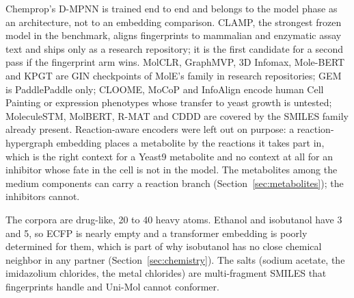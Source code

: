 \begin{table}[htbp]
\centering
\footnotesize
\caption{Provenance of the twelve encoders: representation family, training corpus,
objective and source. \tcflagext~Temporary: the linked works are not yet in the library
mirror and are given by their public link; the flag lifts when they are mirrored and cited
through the bibliography.}
\label{tab:provenance}

\end{table}

Chemprop's D-MPNN is trained end to end and belongs to the model phase as an architecture,
not to an embedding comparison. CLAMP, the strongest frozen model in the benchmark, aligns
fingerprints to mammalian and enzymatic assay text and ships only as a research repository;
it is the first candidate for a second pass if the fingerprint arm wins. MolCLR, GraphMVP, 3D
Infomax, Mole-BERT and KPGT are GIN checkpoints of MolE's family in research repositories; GEM
is PaddlePaddle only; CLOOME, MoCoP and InfoAlign encode human Cell Painting or expression
phenotypes whose transfer to yeast growth is untested; MoleculeSTM, MolBERT, R-MAT and CDDD
are covered by the SMILES family already present. Reaction-aware encoders were left out on
purpose: a reaction-hypergraph embedding places a metabolite by the reactions it takes part
in, which is the right context for a Yeast9 metabolite and no context at all for an inhibitor
whose fate in the cell is not in the model. The metabolites among the medium components can
carry a reaction branch (Section~\ref{sec:metabolites}); the inhibitors cannot.

The corpora are drug-like, 20 to 40 heavy atoms. Ethanol and isobutanol have 3 and 5, so
ECFP is nearly empty and a transformer embedding is poorly determined for them, which is part
of why isobutanol has no close chemical neighbor in any partner (Section~\ref{sec:chemistry}).
The salts (sodium acetate, the imidazolium chlorides, the metal chlorides) are multi-fragment
SMILES that fingerprints handle and Uni-Mol cannot conformer.

